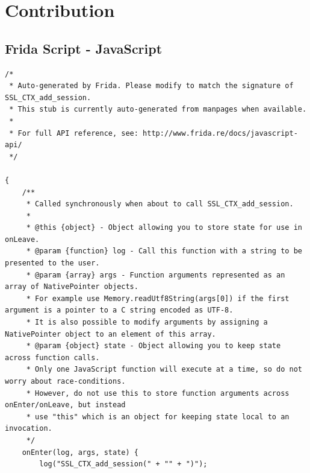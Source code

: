 \documentclass[12pt, a4paper]{report}
\begin{document}
\chapter{Contribution} 




\begin{appendices}

\chapter{}
\section{Frida Script - JavaScript}


 

\begin{lstlisting}[frame=single, breaklines=true]
/*
 * Auto-generated by Frida. Please modify to match the signature of SSL_CTX_add_session.
 * This stub is currently auto-generated from manpages when available.
 *
 * For full API reference, see: http://www.frida.re/docs/javascript-api/
 */

{
    /**
     * Called synchronously when about to call SSL_CTX_add_session.
     *
     * @this {object} - Object allowing you to store state for use in onLeave.
     * @param {function} log - Call this function with a string to be presented to the user.
     * @param {array} args - Function arguments represented as an array of NativePointer objects.
     * For example use Memory.readUtf8String(args[0]) if the first argument is a pointer to a C string encoded as UTF-8.
     * It is also possible to modify arguments by assigning a NativePointer object to an element of this array.
     * @param {object} state - Object allowing you to keep state across function calls.
     * Only one JavaScript function will execute at a time, so do not worry about race-conditions.
     * However, do not use this to store function arguments across onEnter/onLeave, but instead
     * use "this" which is an object for keeping state local to an invocation.
     */
    onEnter(log, args, state) {
        log("SSL_CTX_add_session(" + "" + ")");


\end{lstlisting}
\end{appendices}
\end{document}
